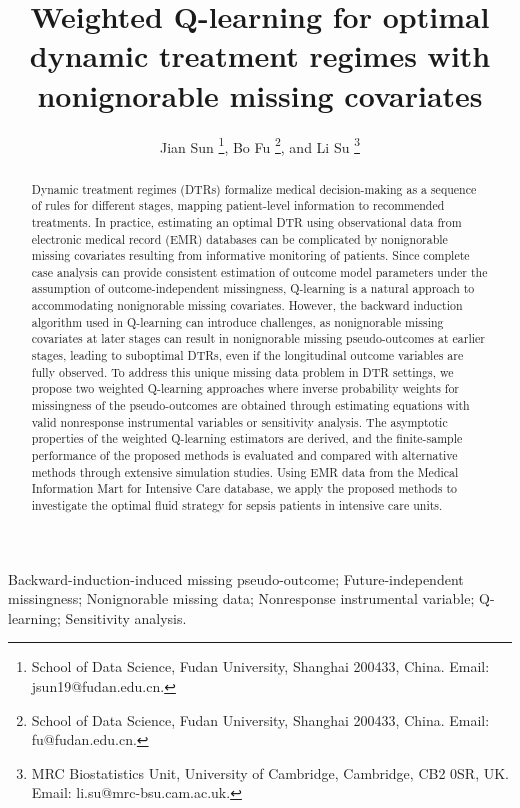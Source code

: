 \documentclass[12pt]{article}
\title{Weighted Q-learning for optimal dynamic treatment regimes with nonignorable missing covariates}
\author{Jian Sun \thanks{School of Data Science,  Fudan University, Shanghai 200433, China. Email: jsun19@fudan.edu.cn.}, Bo Fu \thanks{School of Data Science,  Fudan University, Shanghai 200433, China. Email: fu@fudan.edu.cn.}, and Li Su \thanks{MRC Biostatistics Unit, University of Cambridge, Cambridge, CB2 0SR, UK. Email: li.su@mrc-bsu.cam.ac.uk.}}
\date{}
\begin{document}
\maketitle

\begin{abstract}
Dynamic treatment regimes (DTRs)  formalize medical decision-making as a sequence of rules for different stages, mapping patient-level information to recommended treatments. In practice, estimating an optimal DTR using observational data from electronic medical  record (EMR) databases can be complicated by nonignorable missing covariates resulting from %
informative monitoring of patients. Since complete case analysis can provide consistent estimation of outcome model parameters under the assumption of outcome-independent missingness, Q-learning is a natural approach to accommodating nonignorable missing covariates. 
However, the backward induction algorithm used in Q-learning can introduce challenges, as nonignorable missing covariates at later stages can result in nonignorable missing pseudo-outcomes at earlier stages, leading to suboptimal DTRs, even if the longitudinal outcome variables are fully observed. To address this unique missing data problem in DTR settings, we propose two weighted Q-learning approaches where inverse probability weights for missingness of the pseudo-outcomes are obtained through estimating equations with valid nonresponse instrumental variables or sensitivity analysis. The asymptotic properties of the weighted Q-learning estimators are derived, and
the finite-sample performance of the proposed methods is evaluated and compared with alternative methods through extensive simulation studies. Using EMR data from the Medical Information Mart for Intensive Care database, we apply the proposed methods to investigate the optimal fluid strategy for sepsis patients in intensive care units.
\end{abstract}

\begin{keywords}
Backward-induction-induced missing pseudo-outcome; Future-independent missingness; Nonignorable missing data; Nonresponse instrumental variable; Q-learning; Sensitivity analysis. 
\end{keywords}
\end{document}
